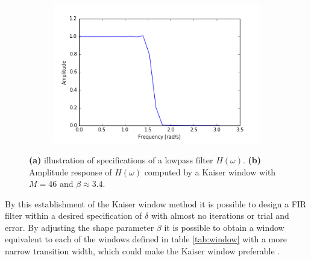 \begin{figure}[H]
\centering
\begin{subfigure}{0.49\textwidth}
\centering
{}
\caption{}
\label{fig:kaiser_spec}
\end{subfigure}
\begin{subfigure}{0.49\textwidth}
\centering
\includegraphics[width=\textwidth]{figures/filter_teori/kaiser_H.png}
\caption{}
\label{fig:kaiser_H}
\end{subfigure}
\caption{\textbf{(a)} illustration of specifications of a lowpass filter $H(\omega)$. \textbf{(b)} Amplitude response of $H(\omega)$ computed by a Kaiser window with $M=46$ and $\beta \approx 3.4$.}
\end{figure}

By this establishment of the Kaiser window method it is possible to design a FIR filter within a desired specification of $\delta$ with almost no iterations or trial and error. By adjusting the shape parameter $\beta$ it is possible to obtain a window equivalent to each of the windows defined in table \ref{tab:window} with a more narrow transition width, which could make the Kaiser window preferable .

